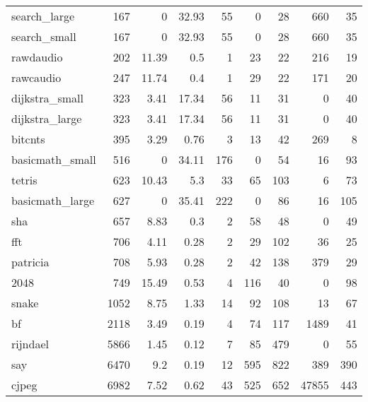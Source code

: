 \begin{tabular}{lrrrrrrrr}
 search\_large    &            167 &     0    &  32.93 &   55 &      0 &           28 &   660 &    35 \\
 search\_small    &            167 &     0    &  32.93 &   55 &      0 &           28 &   660 &    35 \\
 rawdaudio       &            202 &    11.39 &   0.5  &    1 &     23 &           22 &   216 &    19 \\
 rawcaudio       &            247 &    11.74 &   0.4  &    1 &     29 &           22 &   171 &    20 \\
 dijkstra\_small  &            323 &     3.41 &  17.34 &   56 &     11 &           31 &     0 &    40 \\
 dijkstra\_large  &            323 &     3.41 &  17.34 &   56 &     11 &           31 &     0 &    40 \\
 bitcnts         &            395 &     3.29 &   0.76 &    3 &     13 &           42 &   269 &     8 \\
 basicmath\_small &            516 &     0    &  34.11 &  176 &      0 &           54 &    16 &    93 \\
 tetris          &            623 &    10.43 &   5.3  &   33 &     65 &          103 &     6 &    73 \\
 basicmath\_large &            627 &     0    &  35.41 &  222 &      0 &           86 &    16 &   105 \\
 sha             &            657 &     8.83 &   0.3  &    2 &     58 &           48 &     0 &    49 \\
 fft             &            706 &     4.11 &   0.28 &    2 &     29 &          102 &    36 &    25 \\
 patricia        &            708 &     5.93 &   0.28 &    2 &     42 &          138 &   379 &    29 \\
 2048            &            749 &    15.49 &   0.53 &    4 &    116 &           40 &     0 &    98 \\
 snake           &           1052 &     8.75 &   1.33 &   14 &     92 &          108 &    13 &    67 \\
 bf              &           2118 &     3.49 &   0.19 &    4 &     74 &          117 &  1489 &    41 \\
 rijndael        &           5866 &     1.45 &   0.12 &    7 &     85 &          479 &     0 &    55 \\
 say             &           6470 &     9.2  &   0.19 &   12 &    595 &          822 &   389 &   390 \\
 cjpeg           &           6982 &     7.52 &   0.62 &   43 &    525 &          652 & 47855 &   443 \\

\end{tabular}
